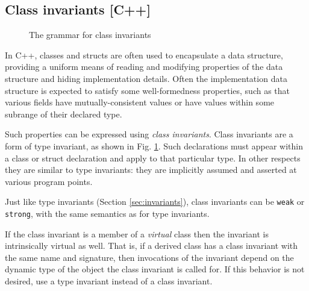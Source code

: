 \subsection{Class invariants [C++]}

\begin{figure}[t]
\begin{cadre}

\end{cadre}
\caption{The grammar for class invariants}
\label{fig:gram:classinvariant}
\end{figure}

In C++, classes and structs are often used to encapsulate a data structure, 
providing a uniform means of reading and modifying properties of the data
structure and hiding implementation details. Often the implementation
data structure is expected to satisfy some well-formedness properties, such as
that various fields have mutually-consistent values or have values within
some subrange of their declared type.

Such properties can be expressed using \textit{class invariants}. Class invariants
are a form of type invariant, as shown in Fig. \ref{fig:gram:classinvariant}.
Such declarations must appear within a class or struct declaration and 
apply to that particular type. In other respects they are similar to 
type invariants: they are implicitly assumed and asserted at various
program points.

Just like type invariants (Section \ref{sec:invariants}), class invariants can be \lstinline|weak| or \lstinline|strong|, with the same semantics as for type invariants.

If the class invariant is a member of a \textit{virtual} class then
the invariant is intrinsically virtual as well. That is, if a derived
class has a class invariant with the same name and signature, then
invocations of the invariant depend on the dynamic type of the
object the class invariant is called for. If this behavior is not
desired, use a type invariant instead of a class invariant.
